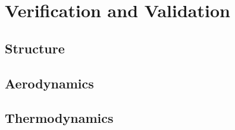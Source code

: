 \section{Verification and Validation}

\subsection{Structure} \label{sec:VandVstruc}


\subsection{Aerodynamics} \label{sec:VandVaero}


\subsection{Thermodynamics} \label{sec:VandVthermo}

